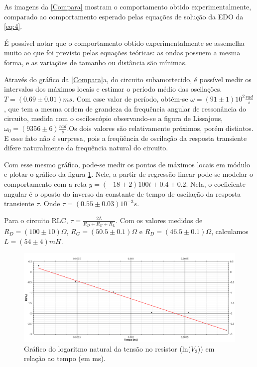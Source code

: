 \documentclass[11pt,a4paper]{article}
\begin{document}
    
    As imagens da \cref{Compara} mostram o comportamento obtido experimentalmente, comparado ao comportamento esperado pelas equações de solução da EDO da \cref{eq:4}.
    
        
    
    É possível notar que o comportamento obtido experimentalmente se assemelha muito ao que foi previsto pelas equações teóricas: as ondas possuem a mesma forma, e as variações de tamanho ou distância são mínimas.
    
    
    Através do gráfico da \cref{Compara}a, do circuito subamortecido, é possível medir os intervalos dos máximos locais e estimar o período médio das oscilações. $T = (0.69 \pm 0.01) ms$. Com esse valor de período, obtém-se $\omega = {(91 \pm 1)10^2 \frac{rad}{s}}$, que tem a mesma ordem de grandeza da frequência angular de ressonância do circuito, medida com o osciloscópio observando-se a figura de Lissajous, $\omega _0 = (9356 \pm 6) \frac{rad}{s}$.Os dois valores são relativamente próximos, porém distintos. E esse fato não é surpresa, pois a freqüência de oscilação da resposta transiente difere naturalmente da frequência natural do circuito.
    
    
    Com esse mesmo gráfico, pode-se medir os pontos de máximos locais em módulo e plotar o gráfico da figura \cref{RetaLog}. Nele, a partir de regressão linear pode-se modelar o comportamento com a reta $y = (-18 \pm 2)100t + 0.4 \pm 0.2$. Nela, o coeficiente angular é o oposto do inverso da constante de tempo de oscilação da resposta transiente $\tau$. Onde $\tau = (0.55 \pm 0.03) {10^{-3}}{s}$.
    
    Para o circuito RLC, $\tau = \frac{2L}{R_D + R_G + R_L}$. Com os valores medidos de $R_D = (100 \pm 10)\Omega$, $R_G = (50.5 \pm 0.1)\Omega$ e $R_D = (46.5 \pm 0.1)\Omega$, calculamos $L = (54 \pm 4)mH$. 
    
    \begin{figure}[!htb]
    \centering
    \includegraphics[scale=0.38]{RetaLog.png}
    \caption{Gráfico do logaritmo natural da tensão no resistor (ln($V_2$)) em relação ao tempo (em ms).}
    \label{RetaLog}
    \end{figure}
    
\end{document}
